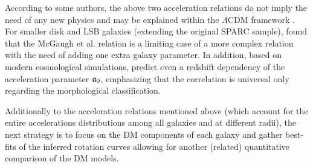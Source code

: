 According to some authors, the above two acceleration relations do not imply the need of any new physics and may be explained within the $\Lambda$CDM framework \citep{2016MNRAS.456L.127D,2017MNRAS.466.1648K,2016arXiv161208857S,2018FoPh...48.1517S}. For smaller disk and LSB galaxies (extending the original SPARC sample), \citet{2019ApJ...873..106D} found that the McGaugh et al. relation is a limiting case of a more complex relation with the need of adding one extra galaxy parameter. In addition, based on modern cosmological simulations, \citet{2017ApJ...835L..17K} predict even a redshift dependency of the acceleration parameter $\mathfrak{a}_0$, emphasizing that the correlation is universal only regarding the morphological classification.

Additionally to the acceleration relations mentioned above (which account for the entire accelerations distributions among all galaxies and at different radii), the next strategy is to focus on the DM components of each galaxy and gather best-fits of the inferred rotation curves allowing for another (related) quantitative comparison of the DM models.

